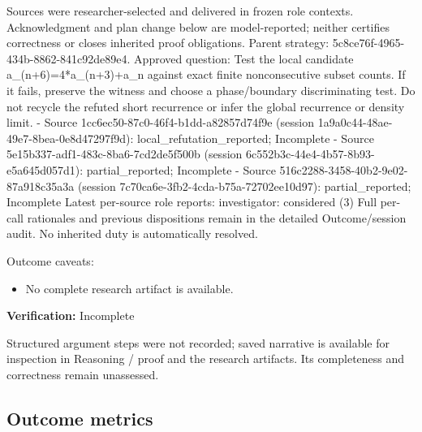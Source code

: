 \documentclass[11pt]{article}
\begin{document}
Sources were researcher-selected and delivered in frozen role contexts. Acknowledgment and plan change below are model-reported; neither certifies correctness or closes inherited proof obligations.
Parent strategy: 5c8ce76f-4965-434b-8862-841c92de89e4. Approved question: Test the local candidate a\_(n+6)=4*a\_(n+3)+a\_n against exact finite nonconsecutive subset counts. If it fails, preserve the witness and choose a phase/boundary discriminating test. Do not recycle the refuted short recurrence or infer the global recurrence or density limit.
- Source 1cc6ec50-87c0-46f4-b1dd-a82857d74f9e (session 1a9a0c44-48ae-49e7-8bea-0e8d47297f9d): local\_refutation\_reported; Incomplete
- Source 5e15b337-adf1-483c-8ba6-7cd2de5f500b (session 6c552b3c-44e4-4b57-8b93-e5a645d057d1): partial\_reported; Incomplete
- Source 516c2288-3458-40b2-9e02-87a918c35a3a (session 7c70ca6e-3fb2-4cda-b75a-72702ee10d97): partial\_reported; Incomplete
Latest per-source role reports: investigator: considered (3)
Full per-call rationales and previous dispositions remain in the detailed Outcome/session audit. No inherited duty is automatically resolved.\par
Outcome caveats:\par
\begin{itemize}
\item No complete research artifact is available.
\end{itemize}
\textbf{Verification:} Incomplete\par
Structured argument steps were not recorded; saved narrative is available for inspection in Reasoning / proof and the research artifacts. Its completeness and correctness remain unassessed.\par
\subsection{Outcome metrics}
\end{document}
